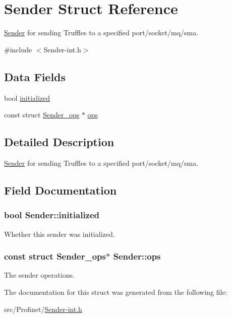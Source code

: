 \hypertarget{struct_sender}{}\section{Sender Struct Reference}
\label{struct_sender}


\hyperlink{struct_sender}{Sender} for sending Truffles to a specified port/socket/mq/sma.  




{\ttfamily \#include $<$Sender-\/int.\+h$>$}

\subsection*{Data Fields}
\begin{DoxyCompactItemize}
\item 
bool \hyperlink{struct_sender_afb5b34bfb1a846008ee2d7e725ba5e12}{initialized}
\item 
const struct \hyperlink{struct_sender__ops}{Sender\+\_\+ops} $\ast$ \hyperlink{struct_sender_afaa1a69a492fece5b53b670bdb9d3b69}{ops}
\end{DoxyCompactItemize}


\subsection{Detailed Description}
\hyperlink{struct_sender}{Sender} for sending Truffles to a specified port/socket/mq/sma. 

\subsection{Field Documentation}
\hypertarget{struct_sender_afb5b34bfb1a846008ee2d7e725ba5e12}{}
\subsubsection[{initialized}]{\setlength{\rightskip}{0pt plus 5cm}bool Sender\+::initialized}\label{struct_sender_afb5b34bfb1a846008ee2d7e725ba5e12}
Whether this sender was initialized. \hypertarget{struct_sender_afaa1a69a492fece5b53b670bdb9d3b69}{}
\subsubsection[{ops}]{\setlength{\rightskip}{0pt plus 5cm}const struct {\bf Sender\+\_\+ops}$\ast$ Sender\+::ops}\label{struct_sender_afaa1a69a492fece5b53b670bdb9d3b69}
The sender operations. 

The documentation for this struct was generated from the following file\+:\begin{DoxyCompactItemize}
\item 
src/\+Profinet/\hyperlink{_sender-int_8h}{Sender-\/int.\+h}\end{DoxyCompactItemize}
